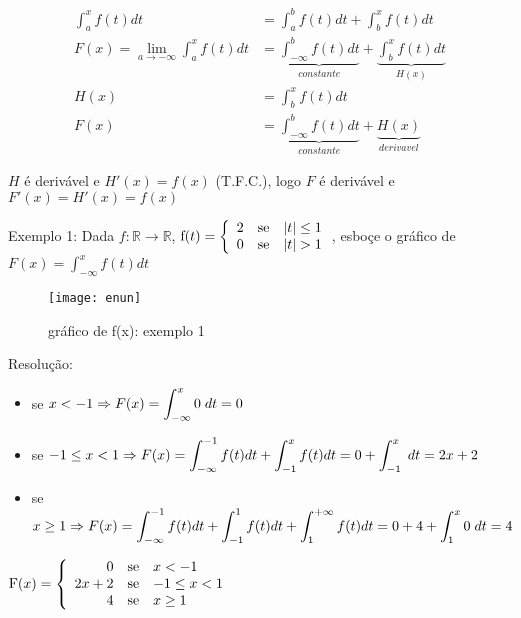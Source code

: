 \documentclass[12pt,openany, letterpaper]{book}
\begin{document}
\begin{align*}
\int_a^x f(t)dt &= \int_a^b f(t)dt + \int_b^x f(t)dt \\
F(x) = \lim_{a\rightarrow - \infty}\int_a^xf(t)dt &= \underbrace{\int_{-\infty}^b f(t)dt}_{constante} + \underbrace{\int_b^x f(t)dt}_{H(x)}\\
H(x) &= \int_b^x f(t)dt \\
F(x) &= \underbrace{\int_{-\infty}^b f(t)dt}_{constante}+ \underbrace{H(x)}_{derivavel} 
\end{align*}

$H$ é derivável e $H'(x) = f(x)$ (T.F.C.), logo $F$ é derivável e $F'(x)=H'(x)=f(x)$

\vspace{20pt}
Exemplo 1: Dada $f:\mathds{R}\rightarrow\mathds{R}$, $\hbox{f}(t)
= \left\{ \begin{array}{rll}
2 & \hbox{se} &  |t| \leq 1 \\
0 & \hbox{se} &  |t|  > 1 \\
\end{array}\right.$, esboçe o gráfico de $\displaystyle{F(x)=\int_{-\infty}^x f(t)dt}$
\begin{figure}[ht]
\centering
\texttt{[image: enun]}
\caption{gráfico de f(x): exemplo 1}
\label{fig:en1}
\end{figure}

Resolução:
\begin{itemize}
\item se $\displaystyle{x<-1 \Rightarrow F(x) = \int_{-\infty}^x 0\hspace{1mm}dt = 0}$
\item se $\displaystyle{ -1 \leq x < 1 \Rightarrow F(x) = \int_{-\infty}^{-1} f(t) dt + \int_{-1}^x f(t)dt = 0 + \int_{-1}^x \hspace{1mm}dt = 2x+2}$
\item se $\displaystyle{ x \geq 1 \Rightarrow F(x) = \int_{-\infty}^{-1} f(t) dt + \int_{-1}^1 f(t)dt + \int_1^{+\infty}f(t)dt = 0 + 4+ \int_1^x 0 \hspace{1mm}dt = 4}$
\end{itemize}

$\hbox{F}(x)
= \left\{ \begin{array}{rll}
0 & \hbox{se} &  x <-1 \\
2x+2 & \hbox{se} &  -1 \leq x < 1 \\
4 & \hbox{se} & x \geq 1 \\
\end{array}\right.$
\end{document}
